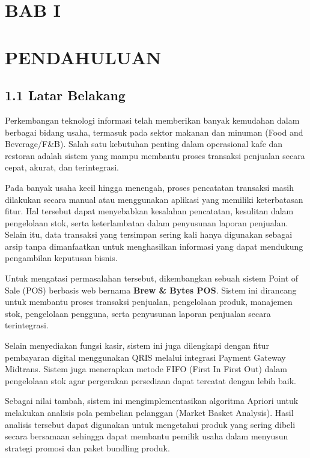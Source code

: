 \section{BAB I}\label{bab-i}

\section{PENDAHULUAN}\label{pendahuluan}

\subsection{1.1 Latar Belakang}\label{latar-belakang}

Perkembangan teknologi informasi telah memberikan banyak kemudahan dalam berbagai bidang usaha, termasuk pada sektor makanan dan minuman (Food and Beverage/F\&B). Salah satu kebutuhan penting dalam operasional kafe dan restoran adalah sistem yang mampu membantu proses transaksi penjualan secara cepat, akurat, dan terintegrasi.

Pada banyak usaha kecil hingga menengah, proses pencatatan transaksi masih dilakukan secara manual atau menggunakan aplikasi yang memiliki keterbatasan fitur. Hal tersebut dapat menyebabkan kesalahan pencatatan, kesulitan dalam pengelolaan stok, serta keterlambatan dalam penyusunan laporan penjualan. Selain itu, data transaksi yang tersimpan sering kali hanya digunakan sebagai arsip tanpa dimanfaatkan untuk menghasilkan informasi yang dapat mendukung pengambilan keputusan bisnis.

Untuk mengatasi permasalahan tersebut, dikembangkan sebuah sistem Point of Sale (POS) berbasis web bernama \textbf{Brew \& Bytes POS}. Sistem ini dirancang untuk membantu proses transaksi penjualan, pengelolaan produk, manajemen stok, pengelolaan pengguna, serta penyusunan laporan penjualan secara terintegrasi.

Selain menyediakan fungsi kasir, sistem ini juga dilengkapi dengan fitur pembayaran digital menggunakan QRIS melalui integrasi Payment Gateway Midtrans. Sistem juga menerapkan metode FIFO (First In First Out) dalam pengelolaan stok agar pergerakan persediaan dapat tercatat dengan lebih baik.

Sebagai nilai tambah, sistem ini mengimplementasikan algoritma Apriori untuk melakukan analisis pola pembelian pelanggan (Market Basket Analysis). Hasil analisis tersebut dapat digunakan untuk mengetahui produk yang sering dibeli secara bersamaan sehingga dapat membantu pemilik usaha dalam menyusun strategi promosi dan paket bundling produk.

